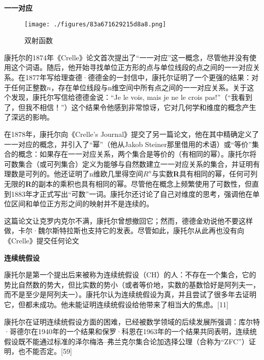 \textbf{一一对应}

\begin{figure}[ht]
\centering
\texttt{[image: ./figures/83a671629215d8a8.png]}
\caption{双射函数} \label{fig_Canto_5}
\end{figure}
康托尔的1874年《Crelle》论文首次提出了“一一对应”这一概念，尽管他并没有使用这个词语。随后，他开始寻找单位正方形的点与单位线段的点之间的一一对应关系。在1877年写给理查德·德德金的一封信中，康托尔证明了一个更强的结果：对于任何正整数\(n\)，存在单位线段与n维空间中所有点之间的一一对应关系。关于这个发现，康托尔写信给德德金说：“Je le vois, mais je ne le crois pas!”（“我看到了，但我不相信！”）这个结果令他感到非常惊讶，它对几何学和维度的概念产生了深远的影响。

在1878年，康托尔向《Crelle's Journal》提交了另一篇论文，他在其中精确定义了一一对应的概念，并引入了“幂”（他从Jakob Steiner那里借用的术语）或“等价”集合的概念：如果存在一一对应关系，两个集合是等价的（有相同的幂）。康托尔将可数集合（或可列集合）定义为能够与自然数建立一一对应关系的集合，并证明有理数是可列的。他还证明了n维欧几里得空间\(R^n\)与实数\textbf{R}具有相同的幂，任何可列无限的\textbf{R}的副本的乘积也具有相同的幂。尽管他在概念上频繁使用了可数性，但直到1883年才正式写出“可数”一词。康托尔还讨论了自己对维度的思考，强调他在单位区间和单位正方形之间的映射并不是连续的。

这篇论文让克罗内克尔不满，康托尔曾想撤回它；然而，德德金劝说他不要这样做，卡尔·魏尔斯特拉斯也支持它的发表。尽管如此，康托尔从此再也没有向《Crelle》提交任何论文

\textbf{连续统假设}

康托尔是第一个提出后来被称为连续统假设（CH）的人：不存在一个集合，它的势比自然数的势大，但比实数的势小（或者等价地，实数的基数恰好是阿列夫一，而不是至少是阿列夫一）。康托尔认为连续统假设为真，并且尝试了很多年去证明它，但都未成功。他未能证明连续统假设给他带来了相当大的焦虑。[11]

康托尔在证明连续统假设方面的困难，已经被数学领域的后续发展所强调：库尔特·哥德尔在1940年的一个结果和保罗·科恩在1963年的一个结果共同表明，连续统假设既不能通过标准的泽尔梅洛–弗兰克尔集合论加选择公理（合称为“ZFC”）证明，也不能否定。[59]


